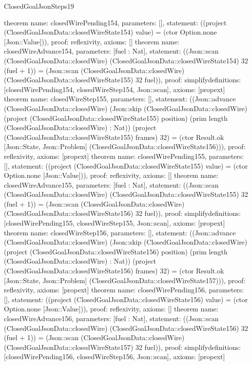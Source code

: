 \begin{lexlean}{ClosedGoalJsonSteps19}
\begin{semanticmodule}
{}
theorem{
 name: closedWirePending154, parameters: [],
 statement: ((project (ClosedGoalJsonData::closedWireState154) value) = (ctor Option.none [Json::Value])), proof: reflexivity{}, axioms: []
}
theorem{
 name: closedWireAdvance154, parameters: [fuel : Nat],
 statement: ((Json::scan (ClosedGoalJsonData::closedWire) (ClosedGoalJsonData::closedWireState154) 32 (fuel + 1)) = (Json::scan (ClosedGoalJsonData::closedWire) (ClosedGoalJsonData::closedWireState155) 32 fuel)), proof: simplify{definitions: [closedWirePending154, closedWireStep154, Json::scan]}, axioms: [propext]
}
theorem{
 name: closedWireStep155, parameters: [],
 statement: ((Json::advance (ClosedGoalJsonData::closedWire) (Json::skip (ClosedGoalJsonData::closedWire) (project (ClosedGoalJsonData::closedWireState155) position) (prim length (ClosedGoalJsonData::closedWire) : Nat)) (project (ClosedGoalJsonData::closedWireState155) frames) 32) = (ctor Result.ok [Json::State, Json::Problem] (ClosedGoalJsonData::closedWireState156))), proof: reflexivity{}, axioms: [propext]
}
theorem{
 name: closedWirePending155, parameters: [],
 statement: ((project (ClosedGoalJsonData::closedWireState155) value) = (ctor Option.none [Json::Value])), proof: reflexivity{}, axioms: []
}
theorem{
 name: closedWireAdvance155, parameters: [fuel : Nat],
 statement: ((Json::scan (ClosedGoalJsonData::closedWire) (ClosedGoalJsonData::closedWireState155) 32 (fuel + 1)) = (Json::scan (ClosedGoalJsonData::closedWire) (ClosedGoalJsonData::closedWireState156) 32 fuel)), proof: simplify{definitions: [closedWirePending155, closedWireStep155, Json::scan]}, axioms: [propext]
}
theorem{
 name: closedWireStep156, parameters: [],
 statement: ((Json::advance (ClosedGoalJsonData::closedWire) (Json::skip (ClosedGoalJsonData::closedWire) (project (ClosedGoalJsonData::closedWireState156) position) (prim length (ClosedGoalJsonData::closedWire) : Nat)) (project (ClosedGoalJsonData::closedWireState156) frames) 32) = (ctor Result.ok [Json::State, Json::Problem] (ClosedGoalJsonData::closedWireState157))), proof: reflexivity{}, axioms: [propext]
}
theorem{
 name: closedWirePending156, parameters: [],
 statement: ((project (ClosedGoalJsonData::closedWireState156) value) = (ctor Option.none [Json::Value])), proof: reflexivity{}, axioms: []
}
theorem{
 name: closedWireAdvance156, parameters: [fuel : Nat],
 statement: ((Json::scan (ClosedGoalJsonData::closedWire) (ClosedGoalJsonData::closedWireState156) 32 (fuel + 1)) = (Json::scan (ClosedGoalJsonData::closedWire) (ClosedGoalJsonData::closedWireState157) 32 fuel)), proof: simplify{definitions: [closedWirePending156, closedWireStep156, Json::scan]}, axioms: [propext]
}
\end{semanticmodule}
\end{lexlean}
